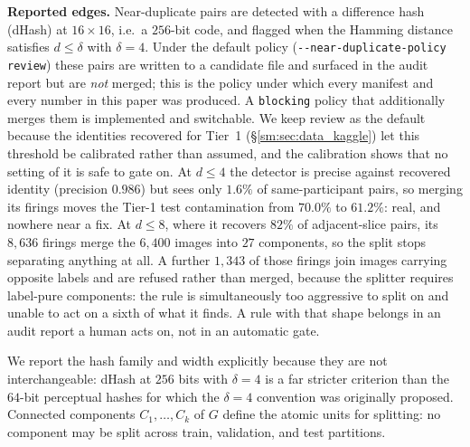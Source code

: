 \documentclass[11pt]{article}
\begin{document}
\textbf{Reported edges.} Near-duplicate pairs are detected with a
difference hash (dHash) at $16\times16$, i.e.\ a $256$-bit code, and
flagged when the Hamming distance satisfies $d \leq \delta$ with
$\delta = 4$. Under the default policy
(\texttt{-{}-near-duplicate-policy review}) these pairs are written to a
candidate file and surfaced in the audit report but are \emph{not}
merged; this is the policy under which every manifest and every number
in this paper was produced. A \texttt{blocking} policy that additionally
merges them is implemented and switchable. We keep review as the default
because the identities recovered for Tier~1
(\S\ref{sm:sec:data_kaggle}) let this threshold be calibrated rather
than assumed, and the calibration shows that no setting of it is
safe to gate on. At $d \leq 4$ the detector is precise against
recovered identity (precision $0.986$) but sees only $1.6\%$ of
same-participant pairs, so merging its firings moves the Tier-1 test
contamination from $70.0\%$ to $61.2\%$: real, and nowhere near a
fix. At $d \leq 8$, where it recovers $82\%$ of adjacent-slice
pairs, its $8{,}636$ firings merge the $6{,}400$ images into $27$
components, so the split stops separating anything at all. A further
$1{,}343$ of those firings join images carrying opposite labels and are
refused rather than merged, because the splitter requires label-pure
components: the rule is simultaneously too aggressive to split on and
unable to act on a sixth of what it finds. A rule with that shape
belongs in an audit report a human acts on, not in an automatic gate.

We report the hash family and width explicitly because they are not
interchangeable: dHash at $256$ bits with $\delta=4$ is a far stricter
criterion than the $64$-bit perceptual hashes for which the
$\delta = 4$ convention was originally proposed.
Connected components $C_1, \ldots, C_k$ of $G$ define the atomic units
for splitting: no component may be split across train, validation, and
test partitions.
\end{document}
